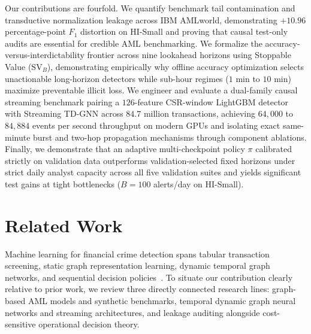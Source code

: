 \documentclass[pdflatex,sn-mathphys,Numbered]{sn-jnl}
\theoremstyle{thmstyleone}
\begin{document}
Our contributions are fourfold. We quantify benchmark tail contamination and transductive normalization leakage across IBM AMLworld, demonstrating $+10.96$ percentage-point $F_1$ distortion on HI-Small and proving that causal test-only audits are essential for credible AML benchmarking. We formalize the accuracy-versus-interdictability frontier across nine lookahead horizons using Stoppable Value ($\text{SV}_B$), demonstrating empirically why offline accuracy optimization selects unactionable long-horizon detectors while sub-hour regimes ($1\text{ min}$ to $10\text{ min}$) maximize preventable illicit loss. We engineer and evaluate a dual-family causal streaming benchmark pairing a $126$-feature CSR-window LightGBM detector with Streaming TD-GNN across $84.7\text{ million}$ transactions, achieving $64{,}000$ to $84{,}884$ events per second throughput on modern GPUs and isolating exact same-minute burst and two-hop propagation mechanisms through component ablations. Finally, we demonstrate that an adaptive multi-checkpoint policy $\pi$ calibrated strictly on validation data outperforms validation-selected fixed horizons under strict daily analyst capacity across all five validation suites and yields significant test gains at tight bottlenecks ($B = 100$ alerts/day on HI-Small).

\section{Related Work}\label{sec:related_work}

Machine learning for financial crime detection spans tabular transaction screening, static graph representation learning, dynamic temporal graph networks, and sequential decision policies~\cite{ferretti2025aml,altman2023ibmaml,rossi2020tgn}. To situate our contribution clearly relative to prior work, we review three directly connected research lines: graph-based AML models and synthetic benchmarks, temporal dynamic graph neural networks and streaming architectures, and leakage auditing alongside cost-sensitive operational decision theory.
\end{document}
